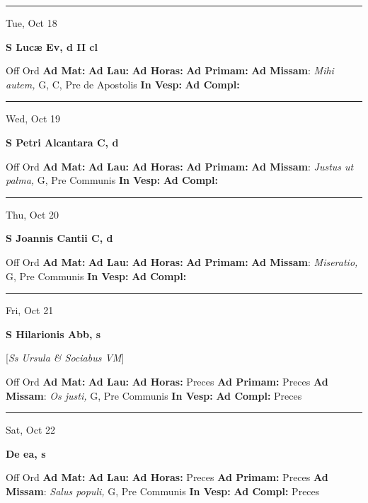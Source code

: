 \documentclass[letterpaper, 10pt]{article}
\begin{document}
\hrule
\begin{center}
Tue, Oct 18
\end{center}\textbf{ \large S Lucæ Ev, \textnormal{\normalsize d II cl}}
\begin{justify}
Off Ord
\textbf{Ad Mat: }
\textbf{Ad Lau: }
\textbf{Ad Horas: }
\textbf{Ad Primam: }
\textbf{Ad Missam}: \textit{Mihi autem,} G, C, Pre de Apostolis
\textbf{In Vesp: }
\textbf{Ad Compl: }\end{justify}



\hrule
\begin{center}
Wed, Oct 19
\end{center}\textbf{ \large S Petri Alcantara C, \textnormal{\normalsize d}}
\begin{justify}
Off Ord
\textbf{Ad Mat: }
\textbf{Ad Lau: }
\textbf{Ad Horas: }
\textbf{Ad Primam: }
\textbf{Ad Missam}: \textit{Justus ut palma,} G, Pre Communis
\textbf{In Vesp: }
\textbf{Ad Compl: }\end{justify}



\hrule
\begin{center}
Thu, Oct 20
\end{center}\textbf{ \large S Joannis Cantii C, \textnormal{\normalsize d}}
\begin{justify}
Off Ord
\textbf{Ad Mat: }
\textbf{Ad Lau: }
\textbf{Ad Horas: }
\textbf{Ad Primam: }
\textbf{Ad Missam}: \textit{Miseratio,} G, Pre Communis
\textbf{In Vesp: }
\textbf{Ad Compl: }\end{justify}



\hrule
\begin{center}
Fri, Oct 21
\end{center}\textbf{ \large S Hilarionis Abb, \textnormal{\normalsize s}}

[\textit{Ss Ursula \& Sociabus VM}]
\begin{justify}
Off Ord
\textbf{Ad Mat: }
\textbf{Ad Lau: }
\textbf{Ad Horas: }Preces
\textbf{Ad Primam: }Preces
\textbf{Ad Missam}: \textit{Os justi,} G, Pre Communis
\textbf{In Vesp: }
\textbf{Ad Compl: }Preces\end{justify}



\hrule
\begin{center}
Sat, Oct 22
\end{center}\textbf{ \large De ea, \textnormal{\normalsize s}}
\begin{justify}
Off Ord
\textbf{Ad Mat: }
\textbf{Ad Lau: }
\textbf{Ad Horas: }Preces
\textbf{Ad Primam: }Preces
\textbf{Ad Missam}: \textit{Salus populi,} G, Pre Communis
\textbf{In Vesp: }
\textbf{Ad Compl: }Preces\end{justify}
\end{document}

